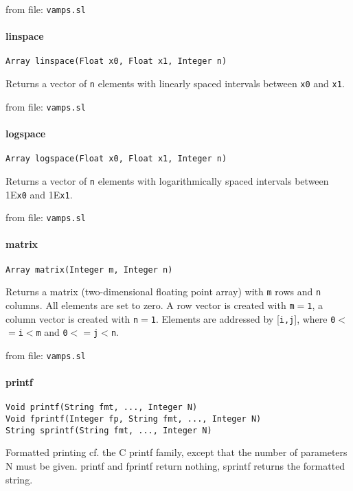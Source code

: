 from file: {\tt vamps.sl}


\paragraph{linspace}
\begin{verbatim}
Array linspace(Float x0, Float x1, Integer n)
\end{verbatim}
Returns a vector of {\tt n} elements with linearly spaced intervals
between {\tt x0} and {\tt x1}.

from file: {\tt vamps.sl}


\paragraph{logspace}
\begin{verbatim}
Array logspace(Float x0, Float x1, Integer n)
\end{verbatim}
Returns a vector of {\tt n} elements with logarithmically spaced intervals
between 1E{\tt x0} and 1E{\tt x1}.

from file: {\tt vamps.sl}


\paragraph{matrix}
\begin{verbatim}
Array matrix(Integer m, Integer n)
\end{verbatim}
Returns a matrix (two-dimensional floating point array)
with {\tt m} rows and {\tt n} columns. All elements are set to zero.
A row vector is created with {\tt m$=$1}, a column vector is created
with {\tt n$=$1}. Elements are addressed by [{\tt i,j}], where {\tt 0$<$$=$i$<$m}
and {\tt 0$<$$=$j$<$n}.

from file: {\tt vamps.sl}


\paragraph{printf}
\begin{verbatim}
Void printf(String fmt, ..., Integer N)
Void fprintf(Integer fp, String fmt, ..., Integer N)
String sprintf(String fmt, ..., Integer N)
\end{verbatim}
Formatted printing cf. the C printf family, except that
the number of parameters N must be given. printf and
fprintf return nothing, sprintf returns the formatted
string.

